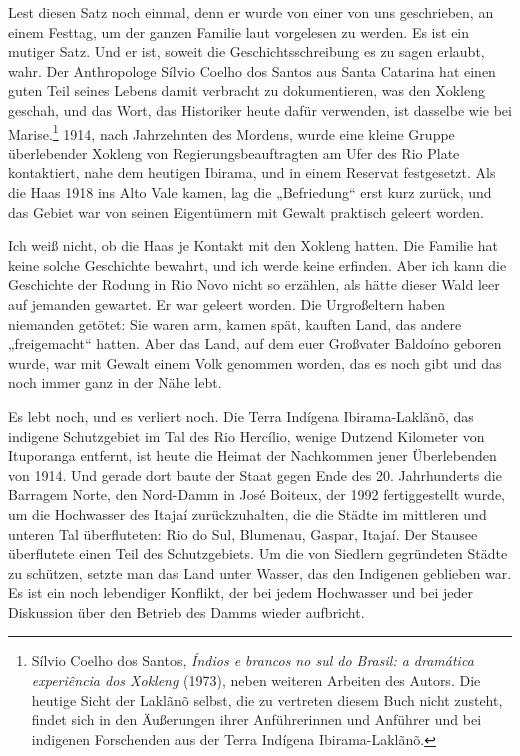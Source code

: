 \documentclass[
  ngerman,
  11pt,
  openany]{book}
\begin{document}
Lest diesen Satz noch einmal, denn er wurde von einer von uns
geschrieben, an einem Festtag, um der ganzen Familie laut vorgelesen zu
werden. Es ist ein mutiger Satz. Und er ist, soweit die
Geschichtsschreibung es zu sagen erlaubt, wahr. Der Anthropologe Sílvio
Coelho dos Santos aus Santa Catarina hat einen guten Teil seines Lebens
damit verbracht zu dokumentieren, was den Xokleng geschah, und das Wort,
das Historiker heute dafür verwenden, ist dasselbe wie bei
Marise.\footnote{Sílvio Coelho dos Santos, \emph{Índios e brancos no sul
  do Brasil: a dramática experiência dos Xokleng} (1973), neben weiteren
  Arbeiten des Autors. Die heutige Sicht der Laklãnõ selbst, die zu
  vertreten diesem Buch nicht zusteht, findet sich in den Äußerungen
  ihrer Anführerinnen und Anführer und bei indigenen Forschenden aus der
  Terra Indígena Ibirama-Laklãnõ.} 1914, nach Jahrzehnten des Mordens,
wurde eine kleine Gruppe überlebender Xokleng von Regierungsbeauftragten
am Ufer des Rio Plate kontaktiert, nahe dem heutigen Ibirama, und in
einem Reservat festgesetzt. Als die Haas 1918 ins Alto Vale kamen, lag
die „Befriedung`` erst kurz zurück, und das Gebiet war von seinen
Eigentümern mit Gewalt praktisch geleert worden.

Ich weiß nicht, ob die Haas je Kontakt mit den Xokleng hatten. Die
Familie hat keine solche Geschichte bewahrt, und ich werde keine
erfinden. Aber ich kann die Geschichte der Rodung in Rio Novo nicht so
erzählen, als hätte dieser Wald leer auf jemanden gewartet. Er war
geleert worden. Die Urgroßeltern haben niemanden getötet: Sie waren arm,
kamen spät, kauften Land, das andere „freigemacht`` hatten. Aber das
Land, auf dem euer Großvater Baldoíno geboren wurde, war mit Gewalt
einem Volk genommen worden, das es noch gibt und das noch immer ganz in
der Nähe lebt.

Es lebt noch, und es verliert noch. Die Terra Indígena Ibirama-Laklãnõ,
das indigene Schutzgebiet im Tal des Rio Hercílio, wenige Dutzend
Kilometer von Ituporanga entfernt, ist heute die Heimat der Nachkommen
jener Überlebenden von 1914. Und gerade dort baute der Staat gegen Ende
des 20. Jahrhunderts die Barragem Norte, den Nord-Damm in José Boiteux,
der 1992 fertiggestellt wurde, um die Hochwasser des Itajaí
zurückzuhalten, die die Städte im mittleren und unteren Tal
überfluteten: Rio do Sul, Blumenau, Gaspar, Itajaí. Der Stausee
überflutete einen Teil des Schutzgebiets. Um die von Siedlern
gegründeten Städte zu schützen, setzte man das Land unter Wasser, das
den Indigenen geblieben war. Es ist ein noch lebendiger Konflikt, der
bei jedem Hochwasser und bei jeder Diskussion über den Betrieb des Damms
wieder aufbricht.
\end{document}
